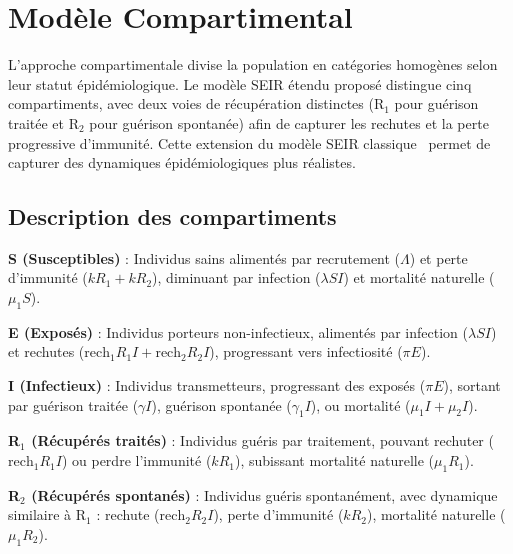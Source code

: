 \documentclass[11pt]{article}
\begin{document}
\section{Modèle Compartimental}\label{sec:modele_compartimental}

L'approche compartimentale divise la population en catégories homogènes selon leur statut épidémiologique. Le modèle SEIR étendu proposé distingue cinq compartiments, avec deux voies de récupération distinctes (R$_1$ pour guérison traitée et R$_2$ pour guérison spontanée) afin de capturer les rechutes et la perte progressive d'immunité. Cette extension du modèle SEIR classique~\cite{hethcote2000} permet de capturer des dynamiques épidémiologiques plus réalistes.

\subsection{Description des compartiments}

\textbf{S (Susceptibles)} : Individus sains alimentés par recrutement ($\Lambda$) et perte d'immunité ($k R_1 + k R_2$), diminuant par infection ($\lambda S I$) et mortalité naturelle ($\mu_1 S$).

\textbf{E (Exposés)} : Individus porteurs non-infectieux, alimentés par infection ($\lambda S I$) et rechutes ($\mathrm{rech}_1 R_1 I + \mathrm{rech}_2 R_2 I$), progressant vers infectiosité ($\pi E$).

\textbf{I (Infectieux)} : Individus transmetteurs, progressant des exposés ($\pi E$), sortant par guérison traitée ($\gamma I$), guérison spontanée ($\gamma_1 I$), ou mortalité ($\mu_1 I + \mu_2 I$).

\textbf{R$_1$ (Récupérés traités)} : Individus guéris par traitement, pouvant rechuter ($\mathrm{rech}_1 R_1 I$) ou perdre l'immunité ($k R_1$), subissant mortalité naturelle ($\mu_1 R_1$).

\textbf{R$_2$ (Récupérés spontanés)} : Individus guéris spontanément, avec dynamique similaire à R$_1$ : rechute ($\mathrm{rech}_2 R_2 I$), perte d'immunité ($k R_2$), mortalité naturelle ($\mu_1 R_2$).
\end{document}

